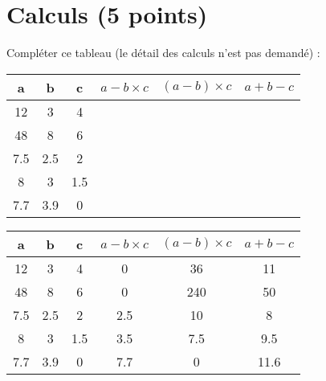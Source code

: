 \section{Calculs (5 points)}

\begin{questions}


\question Compléter ce tableau (le détail des calculs n'est pas demandé) :

\begin{center}
	{\Large \begin{tabular}{|@{\ }c@{\ }|@{\ }c@{\ }|@{\ }c@{\ }|@{\ }c@{\ }|@{\ }c@{\ }|@{\ }c@{\ }|}
	\hline
	\textbf{a} & \textbf{b} & \textbf{c} & \textbf{$a-b \times c$} & \textbf{$(a-b) \times c$} & \textbf{$a + b - c$} \\ \hline
	12         & 3          & 4          &                         &                           &                      \\ \hline
	48         & 8          & 6          &                         &                           &                      \\ \hline
	\num{7.5}  & \num{2.5}  & 2          &                         &                           &                      \\ \hline
	8          & 3          & \num{1.5}  &                         &                           &                      \\ \hline
	\num{7.7}  & \num{3.9}  & 0          &                         &                           &                      \\ \hline
\end{tabular}}
\end{center}


\begin{solution}
	\begin{center}
		{\Large \begin{tabular}{|@{\ }c@{\ }|@{\ }c@{\ }|@{\ }c@{\ }|@{\ }c@{\ }|@{\ }c@{\ }|@{\ }c@{\ }|}
				\hline
				\textbf{a} & \textbf{b} & \textbf{c} & \textbf{$a-b \times c$} & \textbf{$(a-b) \times c$} & \textbf{$a + b - c$} \\ \hline
				12         & 3          & 4          & 0                       &   36                      &   11                 \\ \hline
				48         & 8          & 6          & 0                       &   240                     &       50             \\ \hline
				\num{7.5}  & \num{2.5}  & 2          &  \num{2.5}              &   10                      &        8             \\ \hline
				8          & 3          & \num{1.5}  &  \num{3.5}              &  \num{7.5}                &   \num{9.5}          \\ \hline
				\num{7.7}  & \num{3.9}  & 0          &  \num{7.7}              & 0                         &  \num{11.6}          \\ \hline
		\end{tabular}}
	\end{center}
\end{solution}
\end{questions}